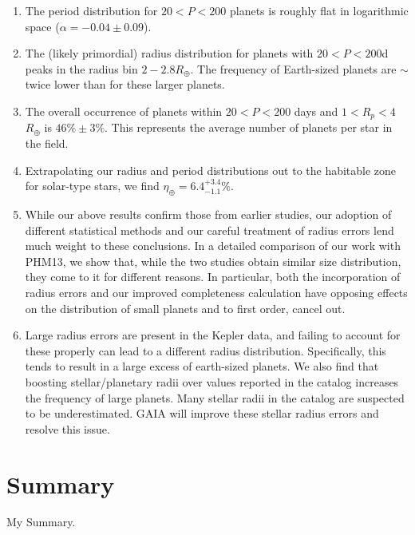 \begin{enumerate}

\item The period distribution for $20<P<200$ planets is roughly flat
  in logarithmic space ($\alpha=-0.04 \pm 0.09$).

\item The (likely primordial) radius distribution for \kep{} planets
  with $20<P<200$d peaks in the radius bin $2-2.8 R_\oplus$. The
  frequency of Earth-sized planets are $\sim$ twice lower than for
  these larger planets.
  
\item The overall occurrence of planets within $20<P<200$ days and
  $1<R_p<4$$R_\oplus$ is $46\% \pm 3\%$. This represents the average
  number of planets per star in the \kep{} field.

\item Extrapolating our radius and period distributions out to the
  habitable
  zone for solar-type stars, we find $\eta_{\oplus}=6.4^{+3.4}_{-1.1}\%$.\\

\item While our above results confirm those from earlier studies, our
  adoption of different statistical methods and our careful treatment
  of radius errors lend much weight to these conclusions.  In a
  detailed comparison of our work with PHM13, we show that, while the
  two studies obtain similar size distribution, they come to it for
  different reasons. In particular, both the incorporation of radius
  errors and our improved completeness calculation have
  opposing effects on the distribution of small planets and to first
  order, cancel out.

\item Large radius errors are present in the Kepler data, and failing
  to account for these properly can lead to a different radius
  distribution. Specifically, this tends to result in a large excess
  of earth-sized planets. We also find that boosting stellar/planetary
  radii over values reported in the \kep{} catalog increases the
  frequency of large planets. Many stellar radii in the \kep{}
  catalog are suspected to be underestimated. GAIA will improve
  these stellar radius errors and resolve this issue.

\end{enumerate}

\section{Summary }

My Summary.